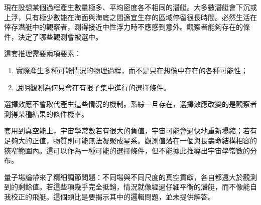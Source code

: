 現在設想某個過程產生數量極多、平均密度各不相同的潛艇。大多數潛艇會下沉或上浮，只有極少數能在海面與海底之間適宜生存的區域停留很長時間。必然生活在倖存潛艇中的觀察者，測得接近中性浮力時不應感到意外。觀察者能夠存在的條件，決定了哪些觀測會被選中。

這套推理需要兩項要素：
\begin{enumerate}
\item 實際產生多種可能情況的物理過程，而不是只在想像中存在的各種可能性；
\item 說明觀測為何只會在有限子集中進行的選擇條件。
\end{enumerate}
選擇效應不會取代產生這些情況的機制。系綜一旦存在，選擇效應改變的是觀察者測得某種結果的條件機率。

\begin{classroomqa}
\end{classroomqa}

套用到真空能上，宇宙學常數若有很大的負值，宇宙可能會過快地重新塌縮；若有足夠大的正值，物質則可能無法凝聚成星系。觀測值落在一個與長壽命結構相容的狹窄範圍內。這可以作為一種可能的選擇條件，但不能據此推導出宇宙學常數的分布。

量子場論帶來了精細調節問題：不同場與不同尺度的真空貢獻，各自都遠大於觀測到的剩餘值。若這些項幾乎完全抵銷，情況就像經過仔細平衡的潛艇，而不像能自我校正的飛艇。這個類比是要揭示其中的邏輯問題，並未提供解答。

\begin{classroomqa}
\end{classroomqa}

